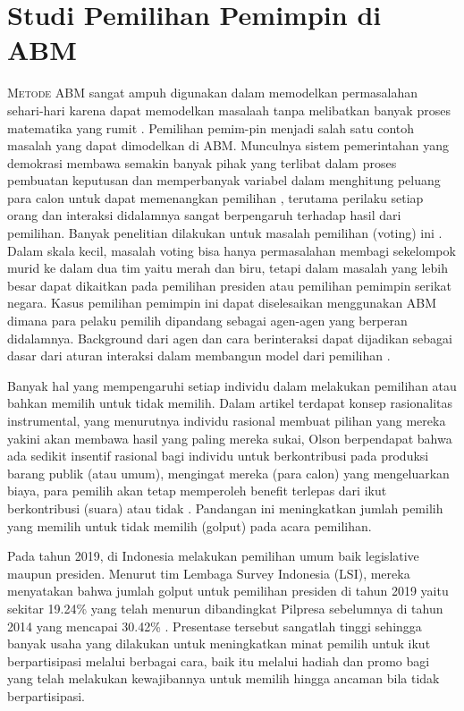 \section{Studi Pemilihan Pemimpin di ABM}

\lettrine{M}{etode} ABM sangat ampuh digunakan dalam memodelkan permasalahan sehari-hari karena dapat memodelkan masalaah tanpa melibatkan banyak proses matematika yang rumit \cite{crooks2018agent}. Pemilihan pemim-pin menjadi salah satu contoh masalah yang dapat dimodelkan di ABM. Munculnya sistem pemerintahan yang demokrasi membawa semakin banyak pihak yang terlibat dalam proses pembuatan keputusan dan memperbanyak variabel dalam menghitung peluang para calon untuk dapat memenangkan pemilihan \cite{feddersen2004rational}, terutama perilaku setiap orang dan interaksi didalamnya sangat berpengaruh terhadap hasil dari pemilihan. Banyak penelitian dilakukan untuk masalah pemilihan (voting) ini \cite{feddersen2004rational,saaty1989group}. Dalam skala kecil, masalah voting bisa hanya permasalahan membagi sekelompok murid ke dalam dua tim yaitu  merah dan biru, tetapi dalam masalah yang lebih besar dapat dikaitkan pada pemilihan presiden atau pemilihan pemimpin serikat negara. Kasus pemilihan pemimpin ini dapat diselesaikan menggunakan ABM dimana para pelaku pemilih dipandang sebagai agen-agen yang berperan didalamnya. Background dari agen dan cara berinteraksi dapat dijadikan sebagai dasar  dari aturan interaksi dalam membangun model dari pemilihan \cite{kazil2020utilizing}.

Banyak hal yang mempengaruhi setiap individu dalam melakukan pemilihan atau bahkan memilih untuk tidak memilih. Dalam artikel \cite{olson2012logic} terdapat konsep rasionalitas instrumental, yang menurutnya individu rasional membuat pilihan yang mereka yakini akan membawa hasil yang paling mereka sukai, Olson berpendapat bahwa ada sedikit insentif rasional bagi individu untuk berkontribusi pada produksi barang publik (atau umum), mengingat mereka (para calon) yang mengeluarkan biaya, para pemilih akan tetap memperoleh benefit terlepas dari ikut berkontribusi (suara) atau tidak \cite{savigny_2014}. Pandangan ini meningkatkan jumlah pemilih yang memilih untuk tidak memilih (golput) pada acara pemilihan.

Pada tahun 2019, di Indonesia melakukan pemilihan umum baik legislative maupun presiden. Menurut tim Lembaga Survey Indonesia (LSI), mereka menyatakan bahwa jumlah golput untuk pemilihan presiden di tahun 2019 yaitu sekitar 19.24\% yang telah menurun dibandingkat Pilpresa sebelumnya di tahun 2014 yang mencapai 30.42\% \cite{bbc_2019}. Presentase tersebut sangatlah tinggi sehingga banyak usaha yang dilakukan untuk meningkatkan minat pemilih untuk ikut berpartisipasi melalui berbagai cara, baik itu melalui hadiah dan promo bagi yang telah melakukan kewajibannya untuk memilih hingga ancaman bila tidak berpartisipasi.

